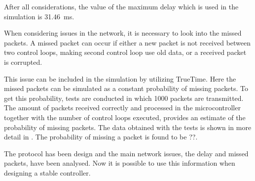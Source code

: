 After all considerations, the value of the maximum delay which is used in the simulation is \SI{31.46}{ms}.

When considering issues in the network, it is necessary to look into the missed packets. A missed packet can occur if either a new packet is not received between two control loops, making second control loop use old data, or a received packet is corrupted.

This issue can be included in the simulation by utilizing TrueTime. Here the missed packets can be simulated as a constant probability of missing packets. To get this probability, tests are conducted in which 1000 packets are transmitted. The amount of packets received correctly and processed in the microcontroller together with the number of control loops executed, provides an estimate of the probability of missing packets. The data obtained with the tests is shown in more detail in . The probability of missing a packet is found to be ??.

The protocol has been design and the main network issues, the delay and missed packets, have been analysed. Now it is possible to use this information when designing a stable controller.



